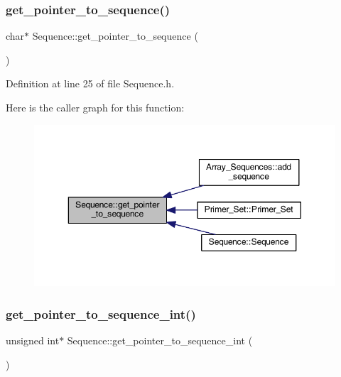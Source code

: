 \subsubsection{\texorpdfstring{get\+\_\+pointer\+\_\+to\+\_\+sequence()}{get\_pointer\_to\_sequence()}}
{\footnotesize\ttfamily char$\ast$ Sequence\+::get\+\_\+pointer\+\_\+to\+\_\+sequence (\begin{DoxyParamCaption}{ }\end{DoxyParamCaption})\hspace{0.3cm}{\ttfamily [inline]}}



Definition at line 25 of file Sequence.\+h.

Here is the caller graph for this function\+:
\nopagebreak
\begin{figure}[H]
\begin{center}
\leavevmode
\includegraphics[width=350pt]{class_sequence_a9c1e7770390e4f1d02ae250d640a32a7_icgraph}
\end{center}
\end{figure}
\mbox{\label{class_sequence_af37c4ac41b89a5081ca71ff2a9d9bd1c}} 
\subsubsection{\texorpdfstring{get\+\_\+pointer\+\_\+to\+\_\+sequence\+\_\+int()}{get\_pointer\_to\_sequence\_int()}}
{\footnotesize\ttfamily unsigned int$\ast$ Sequence\+::get\+\_\+pointer\+\_\+to\+\_\+sequence\+\_\+int (\begin{DoxyParamCaption}{ }\end{DoxyParamCaption})\hspace{0.3cm}{\ttfamily [inline]}}



